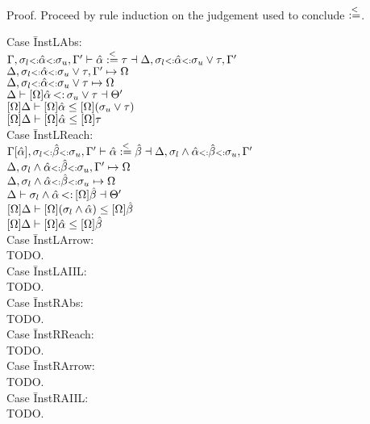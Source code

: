 \documentclass{report}
\begin{document}
Proof. Proceed by rule induction on the judgement used to conclude $\overset{<}{:=}$.
\begin{tabbing}
Case \=InstLAbs:\\
\>$\Gamma,\sigma_l {\scriptstyle{<:}} \hat{\alpha} {\scriptstyle{<:}} \sigma_u,\Gamma' \vdash \hat{\alpha} \overset{<}{:=} \tau \dashv \Delta,\sigma_l {\scriptstyle{<:}} \hat{\alpha} {\scriptstyle{<:}} \sigma_u \vee \tau,\Gamma'$\\
\>$\Delta,\sigma_l {\scriptstyle{<:}} \hat{\alpha} {\scriptstyle{<:}} \sigma_u \vee \tau,\Gamma' \mapsto \Omega$\\
\>$\Delta,\sigma_l {\scriptstyle{<:}} \hat{\alpha} {\scriptstyle{<:}} \sigma_u \vee \tau \mapsto \Omega$\\
\>$\Delta \vdash [\Omega] \alphahat \st \sigma_u \vee \tau \dashv \Theta'$\\
\>$[\Omega]\Delta \vdash [\Omega] \hat{\alpha} \leq [\Omega](\sigma_u \vee \tau)$\\
\>$[\Omega]\Delta \vdash [\Omega] \hat{\alpha} \leq [\Omega]\tau$\\
Case \=InstLReach:\\
\>$	\Gamma[\hat{\alpha}],
		\sigma_{l} {\scriptstyle{<:}} \hat{\beta} {\scriptstyle{<:}} \sigma_{u},
	\Gamma'
	\vdash 
		\hat{\alpha} \overset{<}{:=} \hat{\beta} 
	\dashv 
	\Delta,
		\sigma_{l} \wedge \hat{\alpha} {\scriptstyle{<:}} \hat{\beta} {\scriptstyle{<:}} \sigma_{u},\Gamma'$\\
\>$\Delta,\sigma_{l} \wedge \hat{\alpha} {\scriptstyle{<:}} \hat{\beta} {\scriptstyle{<:}} \sigma_{u},\Gamma'\mapsto \Omega$\\
\>$\Delta,\sigma_{l} \wedge \hat{\alpha} {\scriptstyle{<:}} \hat{\beta} {\scriptstyle{<:}} \sigma_{u} \mapsto \Omega$\\
\>$\Delta \vdash \botbound \wedge \alphahat \st [\Omega]\betahat \dashv \Theta'$\\
\>$[\Omega]\Delta \vdash [\Omega] (\sigma_{l} \wedge \hat{\alpha} ) \leq [\Omega]\hat{\beta}$\\
\>$[\Omega]\Delta \vdash [\Omega] \hat{\alpha} \leq [\Omega]\hat{\beta}$\\
Case \=InstLArrow:\\
\>TODO.\\
Case \=InstLAIIL:\\
\>TODO.\\
Case \=InstRAbs:\\
\>TODO.\\
Case \=InstRReach:\\
\>TODO.\\
Case \=InstRArrow:\\
\>TODO.\\
Case \=InstRAIIL:\\
\>TODO.\\
\end{tabbing}
\end{document}
